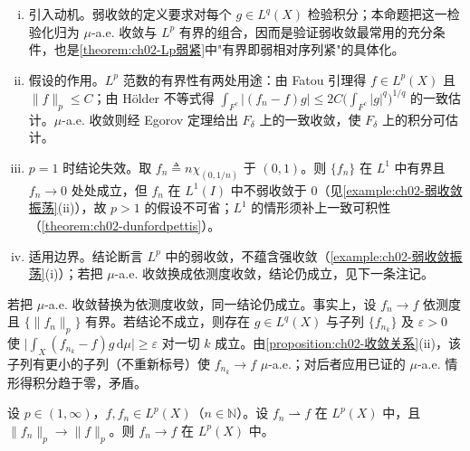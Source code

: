 \documentclass[../../main.tex]{subfiles}%
\begin{document}
\begin{remark}\label{remark:ch02-有界a.e.弱收敛}
\begin{enumerate}[(i)]
\item 引入动机。弱收敛的定义要求对每个 $g\in L^q(X)$ 检验积分；本命题把这一检验化归为 $\mu$-a.e. 收敛与 $L^p$ 有界的组合，因而是验证弱收敛最常用的充分条件，也是\cref{theorem:ch02-Lp弱紧}中"有界即弱相对序列紧"的具体化。
\item 假设的作用。$L^p$ 范数的有界性有两处用途：由 Fatou 引理得 $f\in L^p(X)$ 且 $\|f\|_p\leqslant C$；由 Hölder 不等式得 $\int_{F^c}|(f_n-f)g|\leqslant2C\bigl(\int_{F^c}|g|^q\bigr)^{1/q}$ 的一致估计。$\mu$-a.e. 收敛则经 Egorov 定理给出 $F_\delta$ 上的一致收敛，使 $F_\delta$ 上的积分可估计。
\item $p=1$ 时结论失效。取 $f_n\triangleq n\chi_{(0,1/n)}$ 于 $(0,1)$。则 $\{f_n\}$ 在 $L^1$ 中有界且 $f_n\to0$ 处处成立，但 $f_n$ 在 $L^1(I)$ 中不弱收敛于 $0$（见\cref{example:ch02-弱收敛振荡}(ii)），故 $p>1$ 的假设不可省；$L^1$ 的情形须补上一致可积性（\cref{theorem:ch02-dunfordpettis}）。
\item 适用边界。结论断言 $L^p$ 中的弱收敛，不蕴含强收敛（\cref{example:ch02-弱收敛振荡}(i)）；若把 $\mu$-a.e. 收敛换成依测度收敛，结论仍成立，见下一条注记。
\end{enumerate}
\end{remark}
\begin{remark}\label{remark:ch02-依测度弱收敛}
若把 $\mu$-a.e. 收敛替换为依测度收敛，同一结论仍成立。事实上，设 $f_n\to f$ 依测度且 $\{\|f_n\|_p\}$ 有界。若结论不成立，则存在 $g\in L^q(X)$ 与子列 $\{f_{n_k}\}$ 及 $\varepsilon>0$ 使 $\bigl|\int_X(f_{n_k}-f)g\,\mathrm{d}\mu\bigr|\geqslant\varepsilon$ 对一切 $k$ 成立。由\cref{proposition:ch02-收敛关系}(ii)，该子列有更小的子列（不重新标号）使 $f_{n_k}\to f$ $\mu$-a.e.；对后者应用已证的 $\mu$-a.e. 情形得积分趋于零，矛盾。
\end{remark}

\begin{proposition}\label{proposition:ch02-RadonRiesz}
设 $p\in(1,\infty)$，$f,f_n\in L^p(X)$（$n\in\mathbb N$）。设 $f_n\rightharpoonup f$ 在 $L^p(X)$ 中，且 $\|f_n\|_p\to\|f\|_p$。则 $f_n\to f$ 在 $L^p(X)$ 中。
\end{proposition}
\end{document}
